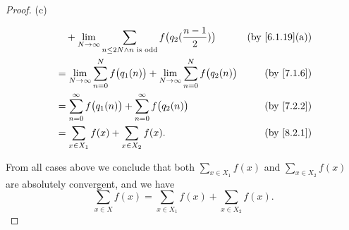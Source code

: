 \begin{proof}{(c)}
\begin{itemize}
\begin{align*}
             & \quad + \lim_{N \to \infty} \sum_{n \leq 2N \land n \text{ is odd}} f\big(q_2(\frac{n - 1}{2})\big)           & \text{(by \cref{6.1.19}(a))} \\
             & = \lim_{N \to \infty} \sum_{n = 0}^N f\big(q_1(n)\big) + \lim_{N \to \infty} \sum_{n = 0}^N f\big(q_2(n)\big) & \text{(by \cref{7.1.6})}     \\
             & = \sum_{n = 0}^\infty f\big(q_1(n)\big) + \sum_{n = 0}^\infty f\big(q_2(n)\big)                               & \text{(by \cref{7.2.2})}     \\
             & = \sum_{x \in X_1} f(x) + \sum_{x \in X_2} f(x).                                                              & \text{(by \cref{8.2.1})}
          \end{align*}
  \end{itemize}
  From all cases above we conclude that both \(\sum_{x \in X_1} f(x)\) and \(\sum_{x \in X_2} f(x)\) are absolutely convergent, and we have
  \[
    \sum_{x \in X} f(x) = \sum_{x \in X_1} f(x) + \sum_{x \in X_2} f(x).
  \]


\end{proof}
